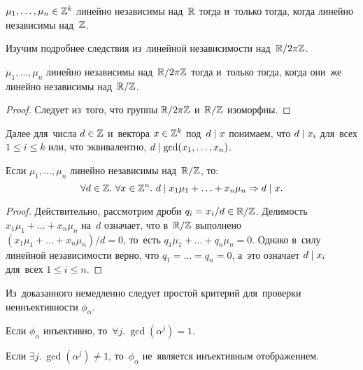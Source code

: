 \documentclass[a4paper,oneside]{article}
\begin{document}
\begin{consequence*}
  $\mu_1, \ldots, \mu_n \in \mathbb{Z}^k$ линейно независимы над~$\mathbb{R}$ тогда и~только тогда, когда линейно независимы над~$\mathbb{Z}$.
\end{consequence*}

Изучим подробнее следствия из~линейной независимости над~$\mathbb{R} / 2 \pi \mathbb{Z}$.

\begin{statement*}
  $\mu_1, \ldots, \mu_n$ линейно независимы над~$\mathbb{R} / 2 \pi \mathbb{Z}$
  тогда и~только тогда, когда они~же линейно независимы над~$\mathbb{R} / \mathbb{Z}$.
\end{statement*}

\begin{proof}
  Следует из~того, что группы $\mathbb{R} / 2 \pi \mathbb{Z}$ и~$\mathbb{R} / \mathbb{Z}$ изоморфны.
\end{proof}

Далее для~числа $d \in \mathbb{Z}$ и~вектора $x \in \mathbb{Z}^k$ под~$d \mid x$ понимаем, что $d \mid x_i$ для~всех $1 \leq i \leq k$
или, что эквивалентно, $d \mid \gcd(x_1, \ldots, x_n)$.

\begin{lemma*}
  Если $\mu_1, \ldots, \mu_n$ линейно независимы над~$\mathbb{R} / \mathbb{Z}$, то:
  \[
    \forall d \in \mathbb{Z}.\ \forall x \in \mathbb{Z}^n.\ d \mid x_1 \mu_1 + \ldots + x_n \mu_n \Rightarrow d \mid x.
  \]
\end{lemma*}

\begin{proof}
  Действительно, рассмотрим дроби $q_i = x_i / d \in \mathbb{R} / \mathbb{Z}$. Делимость $x_1 \mu_1 + \ldots + x_n \mu_n$ на~$d$ означает,
  что в~$\mathbb{R} / \mathbb{Z}$ выполнено $(x_1 \mu_1 + \ldots + x_n \mu_n) / d = 0$, то~есть $q_1 \mu_1 + \ldots + q_n \mu_n = 0$.
  Однако в~силу линейной независимости верно, что $q_1 = \ldots = q_n = 0$, а~это означает $d \mid x_i$ для~всех $1 \leq i \leq n$.
\end{proof}

Из~доказанного немедленно следует простой критерий для~проверки неинъективности $\phi_\alpha$.

\begin{lemma*}
  Если $\phi_\alpha$ инъективно, то~$\forall j.\ \gcd(\alpha^j) = 1$.
\end{lemma*}

\begin{consequence*}
  Если $\exists j.\ \gcd(\alpha^j) \neq 1$, то~$\phi_\alpha$ не~является инъективным отображением.
\end{consequence*}
\end{document}
